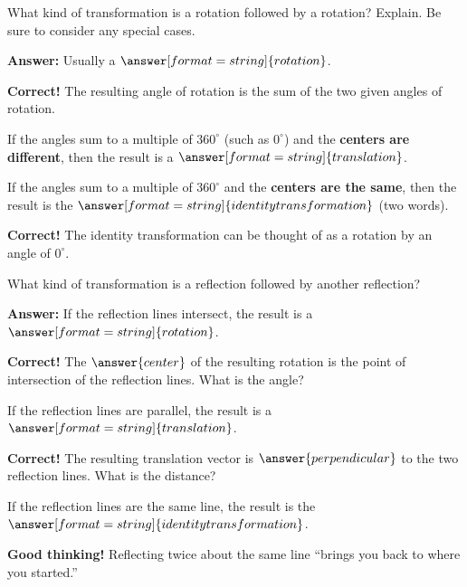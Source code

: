 \documentclass[nooutcomes]{ximera}
\begin{document}
\begin{question}
What kind of transformation is a rotation followed by a rotation?  Explain.  Be sure to consider any special cases.   

\textbf{Answer:} Usually a $\answer[format=string]{rotation}$.  
\begin{feedback}[correct]
\textbf{Correct!} The resulting angle of rotation is the sum of the two given angles of rotation.  
\end{feedback}
\begin{question}
If the angles sum to a multiple of $360^\circ$ (such as $0^\circ$) and the \textbf{centers are different}, then the result is a $\answer[format=string]{translation}$.  
\begin{question}
If the angles sum to a multiple of $360^\circ$ and the \textbf{centers are the same}, then the result is the $\answer[format=string]{identity transformation}$ (two words).  
\begin{feedback}[correct]
\textbf{Correct!} The identity transformation can be thought of as a rotation by an angle of $0^\circ$.
\end{feedback}
\end{question}
\end{question}
\end{question}

\begin{question}
What kind of transformation is a reflection followed by another reflection?    

\textbf{Answer:} If the reflection lines intersect, the result is a $\answer[format=string]{rotation}$.  
\begin{feedback}[correct]
\textbf{Correct!} The $\answer{center}$ of the resulting rotation is the point of intersection of the reflection lines.  What is the angle?
\end{feedback}
\begin{question}
If the reflection lines are parallel, the result is a $\answer[format=string]{translation}$. 
\begin{feedback}[correct]
\textbf{Correct!} The resulting translation vector is $\answer{perpendicular}$ to the two reflection lines. What is the distance?
\end{feedback}
\begin{question}
If the reflection lines are the same line, the result is the $\answer[format=string]{identity transformation}$.
\begin{feedback}[correct]
\textbf{Good thinking!} Reflecting twice about the same line ``brings you back to where you started.'' 
\end{feedback}
\end{question}
\end{question}
\end{question}
\end{document}
